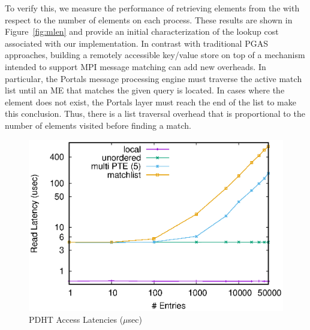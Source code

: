 To verify this, we measure the performance of retrieving elements from
the \pdht with respect to the number of elements on each process.
These results are shown in Figure~\ref{fig:mlen} and provide an
initial characterization of the lookup cost associated with our \pdht
implementation.  In contrast with traditional PGAS approaches,
building a remotely accessible key/value store on top of a mechanism
intended to support MPI message matching can add new overheads.  In
particular, the Portals message processing engine must traverse the
active match list until an ME that matches the given query is located.
In cases where the element does not exist, the Portals layer must
reach the end of the list to make this conclusion.  Thus, there is a
list traversal overhead that is proportional to the number of elements
visited before finding a match.









\begin{figure}[ht]
  \center
  \includegraphics[width=.95\linewidth]{plots/pdhtlatency}
  \caption{PDHT Access Latencies ($\mu$sec)}
  \label{fig:6}
\end{figure}

